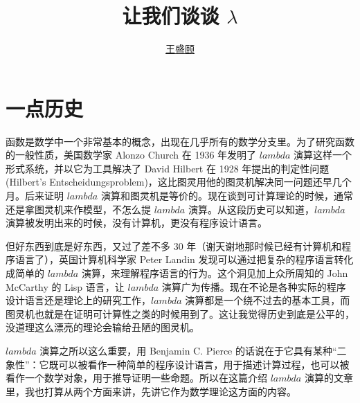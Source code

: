 \documentclass[cs4size,a4paper,adobefonts]{ctexart}
\begin{document}
\title{{\bfseries 让我们谈谈 $\lambda$}}
\author{\href{mailto:txyyss@gmail.com}{王盛颐}}
\date{}
\maketitle

\section{一点历史}

函数是数学中一个非常基本的概念，出现在几乎所有的数学分支里。为了研究函数的一般性质，美国数学家 Alonzo Church 在 1936 年发明了 $lambda$ 演算这样一个形式系统，并以它为工具解决了 David Hilbert 在 1928 年提出的判定性问题 (Hilbert's Entscheidungsproblem)，这比图灵用他的图灵机解决同一问题还早几个月。后来证明 $lambda$ 演算和图灵机是等价的。现在谈到可计算理论的时候，通常还是拿图灵机来作模型，不怎么提 $lambda$ 演算。从这段历史可以知道，$lambda$ 演算被发明出来的时候，没有计算机，更没有程序设计语言。

但好东西到底是好东西，又过了差不多 30 年（谢天谢地那时候已经有计算机和程序语言了），英国计算机科学家 Peter Landin 发现可以通过把复杂的程序语言转化成简单的 $lambda$ 演算，来理解程序语言的行为。这个洞见加上众所周知的 John McCarthy 的 Lisp 语言，让 $lambda$ 演算广为传播。现在不论是各种实际的程序设计语言还是理论上的研究工作，$lambda$ 演算都是一个绕不过去的基本工具，而图灵机也就是在证明可计算性之类的时候用到了。这让我觉得历史到底是公平的，没道理这么漂亮的理论会输给丑陋的图灵机。

$lambda$ 演算之所以这么重要，用 Benjamin C. Pierce 的话说在于它具有某种“二象性”：它既可以被看作一种简单的程序设计语言，用于描述计算过程，也可以被看作一个数学对象，用于推导证明一些命题。所以在这篇介绍 $lambda$ 演算的文章里，我也打算从两个方面来讲，先讲它作为数学理论这方面的内容。
\end{document}
